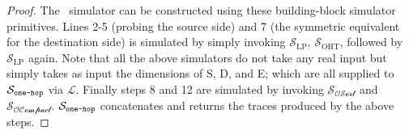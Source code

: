 \begin{proof}
The \onehop\ simulator can be constructed using these building-block simulator primitives.
Lines 2-5 (probing the source side) and 7 (the symmetric equivalent for the destination side) is simulated by simply invoking $\mathcal{S}_{\text{LP}}$, $\mathcal{S}_{\text{OHT}}$, followed by $\mathcal{S}_{\text{LP}}$ again. Note that all the above simulators do not take any real input but simply takes as input the dimensions of S, D, and E; which are all supplied to $\mathcal{S_{\texttt{one-hop}}}$ via $\mathcal{L}$.
Finally steps 8 and 12 are simulated by invoking $\mathcal{S_{\text{OSort}}}$ and $\mathcal{S_{\text{OCompact}}}$.
$\mathcal{S_{\texttt{one-hop}}}$ concatenates and returns the traces produced by the above steps.
\end{proof}